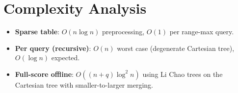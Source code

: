 \documentclass[11pt,a4paper]{article}
\begin{document}
\section{Complexity Analysis}

\begin{itemize}
  \item \textbf{Sparse table}: $O(n \log n)$ preprocessing, $O(1)$ per range-max query.
  \item \textbf{Per query (recursive)}: $O(n)$ worst case (degenerate Cartesian tree), $O(\log n)$ expected.
  \item \textbf{Full-score offline}: $O((n + q) \log^2 n)$ using Li Chao trees on the Cartesian tree with smaller-to-larger merging.
\end{itemize}
\end{document}

